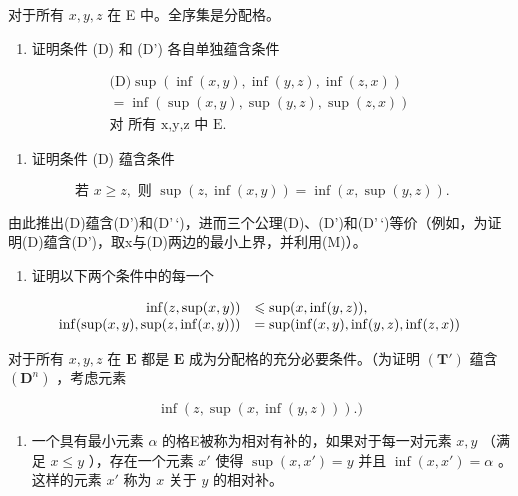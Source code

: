 对于所有 \(x, y, z\) 在 E 中。全序集是分配格。

\begin{enumerate}
\def\labelenumi{(\alph{enumi})}
\tightlist
\item
  证明条件 (D) 和 (D') 各自单独蕴含条件
\end{enumerate}

\[
\begin{array}{l} \text {(D)} \sup (\inf (x, y), \inf (y, z), \inf (z, x)) \\ = \inf (\sup (x, y), \sup (y, z), \sup (z, x)) \\ \text {对 所有 x,y,z 中 E.} \end{array}
\]

\begin{enumerate}
\def\labelenumi{(\alph{enumi})}
\setcounter{enumi}{1}
\tightlist
\item
  证明条件 (D) 蕴含条件
\end{enumerate}

\[
\text {   若   } x \geqslant z, \text {   则   } \sup (z, \inf (x, y)) = \inf (x, \sup (y, z)).\tag{M}
\]

由此推出(D)蕴含(D')和(D'\,`)，进而三个公理(D)、(D')和(D'\,`)等价（例如，为证明(D)蕴含(D')，取x与(D)两边的最小上界，并利用(M)）。

\begin{enumerate}
\def\labelenumi{(\alph{enumi})}
\setcounter{enumi}{2}
\tightlist
\item
  证明以下两个条件中的每一个
\end{enumerate}

\[
\begin{array}{r l} \inf (z, \sup (x, y)) & \leqslant \sup (x, \inf (y, z)), \\ \inf (\sup (x, y), \sup (z, \inf (x, y))) & = \sup (\inf (x, y), \inf (y, z), \inf (z, x)) \end{array}
\]

对于所有 \(x, y, z\) 在 \(\mathbf{E}\) 都是 \(\mathbf{E}\) 成为分配格的充分必要条件。（为证明 \((\mathbf{T}')\) 蕴含 \((\mathbf{D}^n)\) ，考虑元素

\[
\inf (z, \sup (x, \inf (y, z))).)
\]

\begin{enumerate}
\def\labelenumi{\arabic{enumi}.}
\setcounter{enumi}{16}
\tightlist
\item
  一个具有最小元素 \(\alpha\) 的格E被称为相对有补的，如果对于每一对元素 \(x, y\) （满足 \(x \leqslant y\) ），存在一个元素 \(x'\) 使得 \(\sup (x, x') = y\) 并且 \(\inf (x, x') = \alpha\) 。这样的元素 \(x'\) 称为 \(x\) 关于 \(y\) 的相对补。
\end{enumerate}

